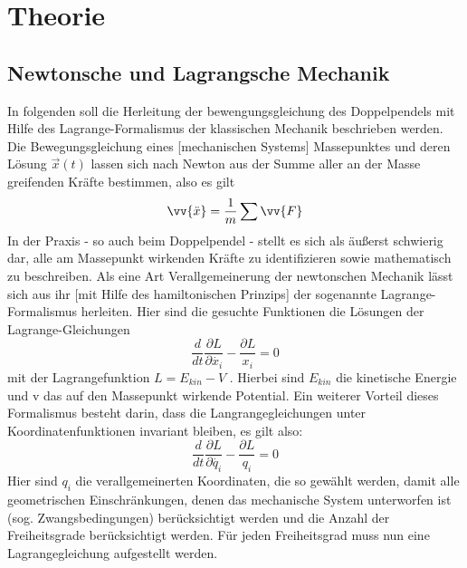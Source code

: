 \section{Theorie}
\subsection{Newtonsche und Lagrangsche Mechanik}
In folgenden soll die Herleitung der bewengungsgleichung des Doppelpendels mit Hilfe des Lagrange-Formalismus der klassischen Mechanik beschrieben werden. \\
Die Bewegungsgleichung eines [mechanischen Systems] Massepunktes und deren Lösung $\vec{x}(t)$ lassen sich nach Newton aus der Summe aller an der Masse greifenden Kräfte bestimmen, also es gilt \begin{equation}
\vv{\ddot{x}}=\frac{1}{m}\sum \vv{F}
\end{equation}
In der Praxis - so auch beim Doppelpendel - stellt es sich als äußerst schwierig dar, alle am Massepunkt wirkenden Kräfte zu identifizieren sowie mathematisch zu beschreiben. Als eine Art Verallgemeinerung der newtonschen Mechanik lässt sich aus ihr [mit Hilfe des hamiltonischen Prinzips] der sogenannte Lagrange-Formalismus herleiten. Hier sind die gesuchte Funktionen die Lösungen der Lagrange-Gleichungen
\begin{equation}
\frac{d}{dt}\frac{\partial L}{\partial\dot{x_i}}-\frac{\partial L}{x_i} = 0
\end{equation}
mit der Lagrangefunktion  $ L=E_{kin} - V $ . Hierbei sind $E_{kin}$ die kinetische Energie und v das auf den Massepunkt wirkende Potential. Ein weiterer Vorteil dieses Formalismus besteht darin, dass die Langrangegleichungen unter Koordinatenfunktionen invariant bleiben, es gilt also:
\begin{equation}
\frac{d}{dt}\frac{\partial L}{\partial\dot{q_i}}-\frac{\partial L}{q_i} = 0
\end{equation}
Hier sind $q_i$ die verallgemeinerten Koordinaten, die so gewählt werden, damit alle geometrischen Einschränkungen, denen das mechanische System unterworfen ist (sog. Zwangsbedingungen) berücksichtigt werden und die Anzahl der Freiheitsgrade berücksichtigt werden. Für jeden Freiheitsgrad muss nun eine Lagrangegleichung aufgestellt werden.
